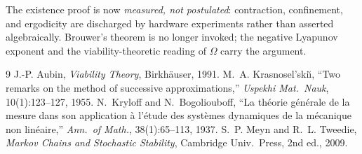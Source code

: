 \documentclass[11pt]{article}
\begin{document}
The existence proof is now \emph{measured, not postulated}: contraction,
confinement, and ergodicity are discharged by hardware experiments rather than
asserted algebraically. Brouwer's theorem is no longer invoked; the negative
Lyapunov exponent and the viability-theoretic reading of $\Omega$ carry the
argument.

\begin{thebibliography}{9}
 J.-P. Aubin, \emph{Viability Theory}, Birkh\"auser, 1991.
 M.~A. Krasnosel'ski\u{\i}, ``Two remarks on the method of
successive approximations,'' \emph{Uspekhi Mat.\ Nauk}, 10(1):123--127, 1955.
 N.~Kryloff and N.~Bogoliouboff, ``La th\'eorie g\'en\'erale
de la mesure dans son application \`a l'\'etude des syst\`emes dynamiques de
la m\'ecanique non lin\'eaire,'' \emph{Ann.\ of Math.}, 38(1):65--113, 1937.
 S.~P. Meyn and R.~L. Tweedie, \emph{Markov Chains and
Stochastic Stability}, Cambridge Univ.\ Press, 2nd ed., 2009.
\end{thebibliography}
\end{document}
